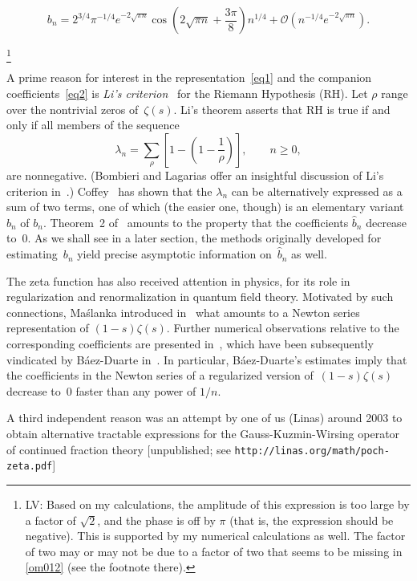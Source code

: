 \documentclass{amsart}
\def\hat{\widehat}
\begin{document}
\begin{equation}\label{asympform}
b_n =2^{3/4}\pi^{-1/4}e^{-2\sqrt{\pi n}}\cos\left(2\sqrt{\pi n}+\frac{3\pi}{8}\right)n^{1/4}
+\mathcal{O}\left(n^{-1/4} e^{-2\sqrt{\pi n}}\right).
\end{equation}

\footnote{
LV: Based on my calculations, the amplitude of this expression is too 
large by a factor of $\sqrt{2}$, and the phase is off by $\pi$ (that is, 
the expression should be negative).  This is supported by my numerical 
calculations as well. The factor of two may or may not be due to a factor
of two that seems to be missing in \eqref{om012} (see the footnote there).
}

A prime reason for  interest in the representation~\eqref{eq1} and the
companion           coefficients~\eqref{eq2}         is     \emph{Li's
criterion}~\cite{Li97} for the   Riemann Hypothesis (RH).   Let $\rho$
range over the  nontrivial zeros of~$\zeta(s)$.   Li's theorem asserts
that RH is true if and only if all members of the sequence
\[
\lambda_n=\sum_\rho \left[1-\left(1-\frac{1}{\rho}\right)\right], \qquad n\ge0,
\]
are nonnegative. (Bombieri and Lagarias
 offer an insightful discussion of Li's criterion in~\cite{BoLa99}.) 
Coffey~\cite{Coffey05} has shown that the $\lambda_n$
can be alternatively  expressed as a  sum of  two terms, one  of which
(the easier one, though) is an elementary variant $\hat b_n$ of $b_n$.
Theorem~2 of~\cite{Coffey05}  amounts to the property that the coefficients $\hat b_n$ 
decrease to~0. As we shall see in a later section, 
the methods originally developed for estimating~$b_n$
yield precise asymptotic information on~$\hat b_n$ as well.

The zeta function has also received attention in physics,
for its role in regularization and renormalization in 
quantum field theory. 
Motivated by such connections, 
Ma\'slanka introduced in~\cite{Maslanka01} 
what amounts to a Newton series representation of $(1-s)\zeta(s)$.
Further numerical observations relative to the corresponding coefficients
are presented in~\cite{Maslanka04}, which
have been subsequently vindicated by B\'aez-Duarte in~\cite{Baez03}.
In particular, B\'aez-Duarte's estimates imply that the coefficients
in the Newton series of a regularized version of~$(1-s)\zeta(s)$ decrease to~0
faster than any power of $1/n$.

A third independent reason was an attempt by one of us (Linas) around 2003 to obtain
alternative tractable expressions for the Gauss-Kuzmin-Wirsing operator of 
continued fraction theory [unpublished; see
\verb|http://linas.org/math/poch-zeta.pdf|]
\end{document}

